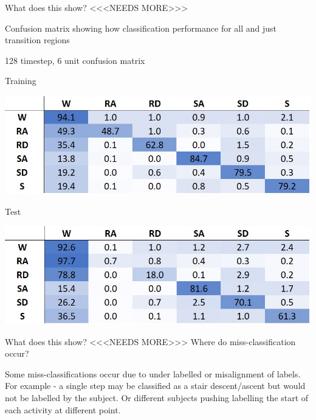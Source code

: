 \documentclass[sensors,article,submit,moreauthors,pdftex]{Definitions/mdpi}
\begin{document}
What does this show? <<<NEEDS MORE>>>

Confusion matrix showing how classification performance for all and just transition regions

\begin{table}[!hbt]
    \centering
    \caption{128 timestep, 6 unit confusion matrix}
    \label{tab:128x6_full_model_confusion_matrix}
    \begin{subtable}{.45\textwidth}
        \centering
        \caption{Training}
        \label{tab:full_model_conf_matrix_training}
        \includegraphics[width=\textwidth]{Figures/results/conf_matricies/Training_128x6_NT.jpg}
    \end{subtable}
    \hfil
    \begin{subtable}{.45\textwidth}
        \centering
        \caption{Test}
        \label{tab:full_model_conf_matrix_test}
        \includegraphics[width=\textwidth]{Figures/results/conf_matricies/Test_128x6_NT.jpg}
    \end{subtable}
\end{table}

What does this show? <<<NEEDS MORE>>>
Where do miss-classification occur?

Some miss-classifications occur due to under labelled or misalignment of labels. For example - a single step may be classified as a stair descent/ascent but would not be labelled by the subject. Or different subjects pushing labelling the start of each activity at different point.
\end{document}
